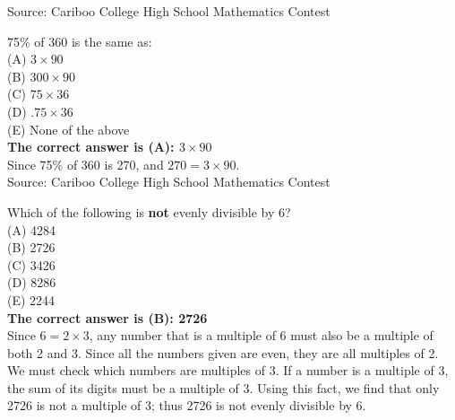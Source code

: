 \documentclass{article}
\begin{document}
\scriptsize
Source: Cariboo College High School Mathematics Contest

\normalsize
75\% of 360 is the same as:\\
(A) $3\times90$\\
(B) $300\times90$\\
(C) $75\times36$\\
(D) $.75\times36$\\
(E) None of the above\\


\textbf{The correct answer is (A): $3\times90$}\\
Since 75\% of 360 is 270, and $270=3\times90$.
\\[5 ex]

\scriptsize
Source: Cariboo College High School Mathematics Contest

\normalsize
Which of the following is \textbf{not} evenly divisible by 6?\\
(A) 4284\\
(B) 2726\\
(C) 3426\\
(D) 8286\\
(E) 2244\\


\textbf{The correct answer is (B): 2726}\\
Since $6=2\times3$, any number that is a multiple of 6 must also be a multiple of both 2 and 3.  Since all the numbers given are even, they are all multiples of 2.  We must check which numbers are multiples of 3.  If a number is a multiple of 3, the sum of its digits must be a multiple of 3.  Using this fact, we find that only 2726 is not a multiple of 3; thus 2726 is not evenly divisible by 6.
\\[5 ex]
\end{document}
